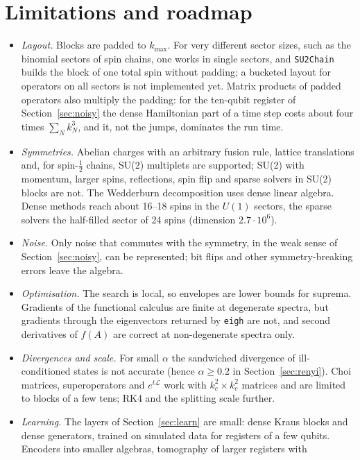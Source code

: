 \documentclass[11pt]{article}
\begin{document}
\section{Limitations and roadmap}\label{sec:limitations}

\begin{itemize}\itemsep1pt
\item \emph{Layout.} Blocks are padded to $k_{\max}$. For very different sector sizes, such as the binomial sectors of
spin chains, one works in single sectors, and \texttt{SU2Chain} builds the block of one total spin without padding; a
bucketed layout for operators on all sectors is not implemented yet. Matrix products of padded operators also multiply
the padding: for the ten-qubit register of Section~\ref{sec:noisy} the dense Hamiltonian part of a time step costs
about four times $\sum_Nk_N^3$, and it, not the jumps, dominates the run time.
\item \emph{Symmetries.} Abelian charges with an arbitrary fusion rule, lattice translations and, for spin-$\frac12$
chains, SU(2) multiplets are supported; SU(2) with momentum, larger spins, reflections, spin flip and sparse solvers in
SU(2) blocks are not. The Wedderburn decomposition uses dense linear algebra. Dense methods reach about 16--18 spins in
the $U(1)$ sectors, the sparse solvers the half-filled sector of 24 spins (dimension $2.7\cdot10^6$).
\item \emph{Noise.} Only noise that commutes with the symmetry, in the weak sense of Section~\ref{sec:noisy}, can be
represented; bit flips and other symmetry-breaking errors leave the algebra.
\item \emph{Optimisation.} The search is local, so envelopes are lower bounds for suprema. Gradients of the functional
calculus are finite at degenerate spectra, but gradients through the eigenvectors returned by \texttt{eigh} are not,
and second derivatives of $f(A)$ are correct at non-degenerate spectra only.
\item \emph{Divergences and scale.} For small $\alpha$ the sandwiched divergence of ill-conditioned states is not
accurate (hence $\alpha\ge0.2$ in Section~\ref{sec:renyi}). Choi matrices, superoperators and $e^{t\mathcal L}$ work
with $k_c^2\times k_c^2$ matrices and are limited to blocks of a few tens; RK4 and the splitting scale further.
\item \emph{Learning.} The layers of Section~\ref{sec:learn} are small: dense Kraus blocks and dense generators, trained
on simulated data for registers of a few qubits. Encoders into smaller algebras, tomography of larger registers with

\end{itemize}
\end{document}
